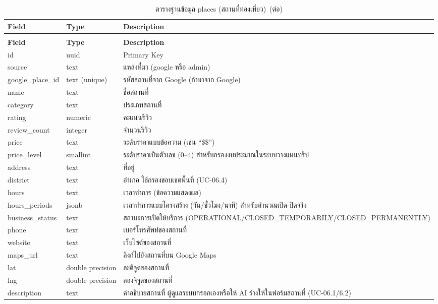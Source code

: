 {\small
\begin{longtable}{|p{3.6cm}|p{2.6cm}|p{6.8cm}|}
\caption{ตารางฐานข้อมูล places (สถานที่ท่องเที่ยว)}\label{tab:db_place}\\
\hline
\textbf{Field} & \textbf{Type} & \textbf{Description} \\
\hline
\endfirsthead
\caption[]{ตารางฐานข้อมูล places (สถานที่ท่องเที่ยว)~(\textnormal{ต่อ})}\\
\hline
\textbf{Field} & \textbf{Type} & \textbf{Description} \\
\hline
\endhead
id & uuid & Primary Key \\ \hline
source & text & แหล่งที่มา (google หรือ admin) \\ \hline
google\_place\_id & text (unique) & รหัสสถานที่จาก Google (ถ้ามาจาก Google) \\ \hline
name & text & ชื่อสถานที่ \\ \hline
category & text & ประเภทสถานที่ \\ \hline
rating & numeric & คะแนนรีวิว \\ \hline
review\_count & integer & จำนวนรีวิว \\ \hline
price & text & ระดับราคาแบบข้อความ (เช่น ``\$\$'') \\ \hline
price\_level & smallint & ระดับราคาเป็นตัวเลข (0--4) สำหรับกรองงบประมาณในระบบวางแผนทริป \\ \hline
address & text & ที่อยู่ \\ \hline
district & text & อำเภอ ใช้กรองขอบเขตพื้นที่ (UC-06.4) \\ \hline
hours & text & เวลาทำการ (ข้อความแสดงผล) \\ \hline
hours\_periods & jsonb & เวลาทำการแบบโครงสร้าง (วัน/ชั่วโมง/นาที) สำหรับคำนวณเปิด-ปิดจริง \\ \hline
business\_status & text & สถานะการเปิดให้บริการ (OPERATIONAL/CLOSED\_TEMPORARILY/CLOSED\_PERMANENTLY) \\ \hline
phone & text & เบอร์โทรศัพท์ของสถานที่ \\ \hline
website & text & เว็บไซต์ของสถานที่ \\ \hline
maps\_url & text & ลิงก์ไปยังสถานที่บน Google Maps \\ \hline
lat & double precision & ละติจูดของสถานที่ \\ \hline
lng & double precision & ลองจิจูดของสถานที่ \\ \hline
description & text & คำอธิบายสถานที่ ผู้ดูแลระบบกรอกเองหรือให้ AI ร่างให้ในฟอร์มสถานที่ (UC-06.1/6.2) \\ \hline

\end{longtable}}

